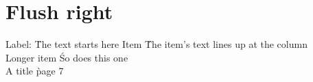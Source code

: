 \section{Flush right}

\begin{tabbing}
Label:  \= The text starts here \kill
\> Item \' The item's text lines up at the column \\
\> Longer item \' So does this one \\
A title \` page 7
\end{tabbing}

